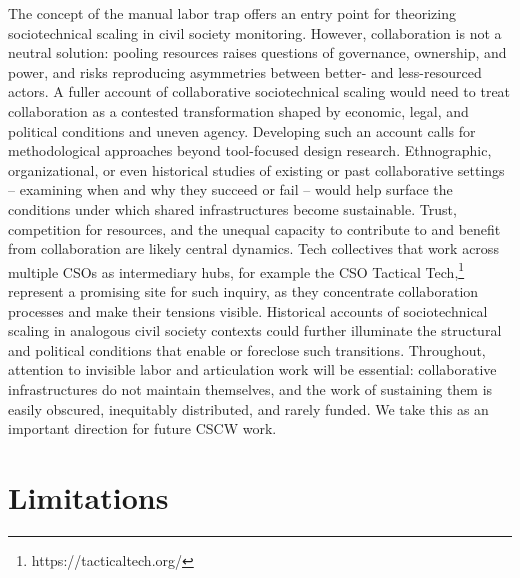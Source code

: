 \documentclass[acmsmall]{acmart}
\begin{document}
The concept of the manual labor trap offers an entry point for theorizing sociotechnical scaling in civil society monitoring. However, collaboration is not a neutral solution: pooling resources raises questions of governance, ownership, and power, and risks reproducing asymmetries between better- and less-resourced actors. A fuller account of collaborative sociotechnical scaling would need to treat collaboration as a contested transformation shaped by economic, legal, and political conditions and uneven agency.
Developing such an account calls for methodological approaches beyond tool-focused design research. Ethnographic, organizational, or even historical studies of existing or past collaborative settings -- examining when and why they succeed or fail -- would help surface the conditions under which shared infrastructures become sustainable. Trust, competition for resources, and the unequal capacity to contribute to and benefit from collaboration are likely central dynamics. Tech collectives that work across multiple CSOs as intermediary hubs, for example the CSO Tactical Tech,\footnote{https://tacticaltech.org/} represent a promising site for such inquiry, as they concentrate collaboration processes and make their tensions visible. Historical accounts of sociotechnical scaling in analogous civil society contexts could further illuminate the structural and political conditions that enable or foreclose such transitions. Throughout, attention to invisible labor and articulation work \cite{star_layers_1999,schmidt_taking_2011} will be essential: collaborative infrastructures do not maintain themselves, and the work of sustaining them is easily obscured, inequitably distributed, and rarely funded. We take this as an important direction for future CSCW work.

\section{Limitations}
\end{document}

